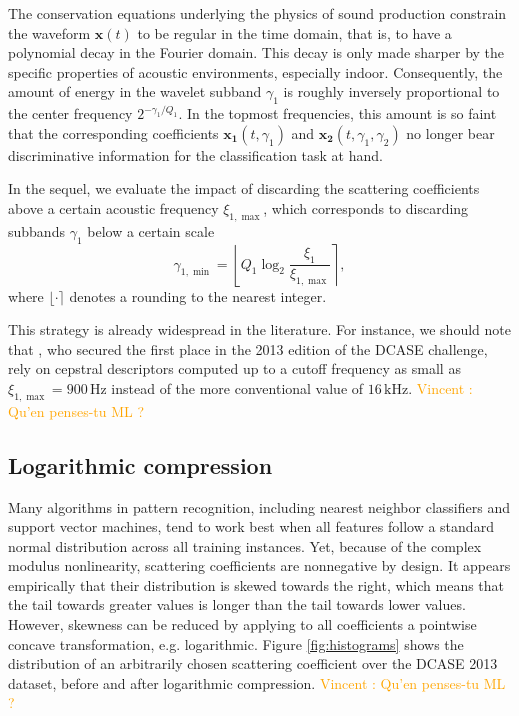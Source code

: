 \documentclass[journal]{IEEEtran}
\makeatletter
\newcommand*{\eg}{e.g.\@\xspace}
\newcommand{\vl}[1]{\textcolor{orange}{Vincent : #1}}
\makeatother
\begin{document}
The conservation equations underlying the physics of sound production constrain the waveform $\boldsymbol{x}(t)$ to be regular in the time domain, that is, to have a polynomial decay in the Fourier domain.
This decay is only made sharper by the specific properties of acoustic environments, especially indoor.
Consequently, the amount of energy in the wavelet subband $\gamma_1$ is roughly inversely proportional to the center frequency $2^{-\gamma_1/Q_1}$.
In the topmost frequencies, this amount is so faint that the corresponding coefficients $\boldsymbol{x_1}(t,\gamma_1)$ and $\boldsymbol{x_2}(t,\gamma_1,\gamma_2)$ no longer bear discriminative information for the classification task at hand.

In the sequel, we evaluate the impact of discarding the scattering coefficients above a certain acoustic frequency $\xi_{1,\max}$, which corresponds to discarding subbands $\gamma_1$ below a certain scale
\begin{equation}
\gamma_{1,\min} =
\left\lfloor Q_1 \log_2 \frac{\xi_1}{\xi_{1,\max}} \right\rceil,
\end{equation}
where $\lfloor \cdot \rceil$ denotes a rounding to the nearest integer.

This strategy is already widespread in the literature.
For instance, we should note that \cite{roma2013}, who secured the first place in the 2013 edition of the DCASE challenge, rely on cepstral descriptors computed up to a cutoff frequency as small as $\xi_{1,\max}  = 900\,\mathrm{Hz}$ instead of the more conventional value of $16\,\mathrm{kHz}$.
\vl{Qu'en penses-tu ML ?}

\subsection{Logarithmic compression}
Many algorithms in pattern recognition, including nearest neighbor classifiers and support vector machines, tend to work best when all features follow a standard normal distribution across all training instances.
Yet, because of the complex modulus nonlinearity, scattering coefficients are nonnegative by design.
It appears empirically that their distribution is skewed towards the right, which means that the tail towards greater values is longer than the tail towards lower values.
However, skewness can be reduced by applying to all coefficients a pointwise concave transformation, \eg logarithmic.
Figure \ref{fig:histograms} shows the distribution of an arbitrarily chosen scattering coefficient over the DCASE 2013 dataset, before and after logarithmic compression.
\vl{Qu'en penses-tu ML ?}
\end{document}
